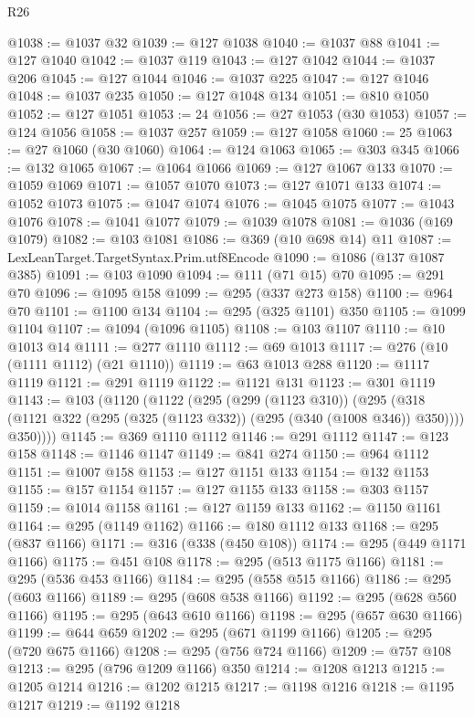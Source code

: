 \begin{lexlean}{R26}
\begin{coremodule}
@1038 := @1037 @32
@1039 := @127 @1038
@1040 := @1037 @88
@1041 := @127 @1040
@1042 := @1037 @119
@1043 := @127 @1042
@1044 := @1037 @206
@1045 := @127 @1044
@1046 := @1037 @225
@1047 := @127 @1046
@1048 := @1037 @235
@1050 := @127 @1048 @134
@1051 := @810 @1050
@1052 := @127 @1051
@1053 := 24
@1056 := @27 @1053 (@30 @1053)
@1057 := @124 @1056
@1058 := @1037 @257
@1059 := @127 @1058
@1060 := 25
@1063 := @27 @1060 (@30 @1060)
@1064 := @124 @1063
@1065 := @303 @345
@1066 := @132 @1065
@1067 := @1064 @1066
@1069 := @127 @1067 @133
@1070 := @1059 @1069
@1071 := @1057 @1070
@1073 := @127 @1071 @133
@1074 := @1052 @1073
@1075 := @1047 @1074
@1076 := @1045 @1075
@1077 := @1043 @1076
@1078 := @1041 @1077
@1079 := @1039 @1078
@1081 := @1036 (@169 @1079)
@1082 := @103 @1081
@1086 := @369 (@10 @698 @14) @11
@1087 := LexLeanTarget.TargetSyntax.Prim.utf8Encode
@1090 := @1086 (@137 @1087 @385)
@1091 := @103 @1090
@1094 := @111 (@71 @15) @70
@1095 := @291 @70
@1096 := @1095 @158
@1099 := @295 (@337 @273 @158)
@1100 := @964 @70
@1101 := @1100 @134
@1104 := @295 (@325 @1101) @350
@1105 := @1099 @1104
@1107 := @1094 (@1096 @1105)
@1108 := @103 @1107
@1110 := @10 @1013 @14
@1111 := @277 @1110
@1112 := @69 @1013
@1117 := @276 (@10 (@1111 @1112) (@21 @1110))
@1119 := @63 @1013 @288
@1120 := @1117 @1119
@1121 := @291 @1119
@1122 := @1121 @131
@1123 := @301 @1119
@1143 := @103
    (@1120
      (@1122
        (@295
          (@299 (@1123 @310))
          (@295
            (@318 (@1121 @322 (@295 (@325 (@1123 @332)) (@295 (@340 (@1008 @346)) @350))))
            @350))))
@1145 := @369 @1110 @1112
@1146 := @291 @1112
@1147 := @123 @158
@1148 := @1146 @1147
@1149 := @841 @274
@1150 := @964 @1112
@1151 := @1007 @158
@1153 := @127 @1151 @133
@1154 := @132 @1153
@1155 := @157 @1154
@1157 := @127 @1155 @133
@1158 := @303 @1157
@1159 := @1014 @1158
@1161 := @127 @1159 @133
@1162 := @1150 @1161
@1164 := @295 (@1149 @1162)
@1166 := @180 @1112 @133
@1168 := @295 (@837 @1166)
@1171 := @316 (@338 (@450 @108))
@1174 := @295 (@449 @1171 @1166)
@1175 := @451 @108
@1178 := @295 (@513 @1175 @1166)
@1181 := @295 (@536 @453 @1166)
@1184 := @295 (@558 @515 @1166)
@1186 := @295 (@603 @1166)
@1189 := @295 (@608 @538 @1166)
@1192 := @295 (@628 @560 @1166)
@1195 := @295 (@643 @610 @1166)
@1198 := @295 (@657 @630 @1166)
@1199 := @644 @659
@1202 := @295 (@671 @1199 @1166)
@1205 := @295 (@720 @675 @1166)
@1208 := @295 (@756 @724 @1166)
@1209 := @757 @108
@1213 := @295 (@796 @1209 @1166) @350
@1214 := @1208 @1213
@1215 := @1205 @1214
@1216 := @1202 @1215
@1217 := @1198 @1216
@1218 := @1195 @1217
@1219 := @1192 @1218

\end{coremodule}
\end{lexlean}
